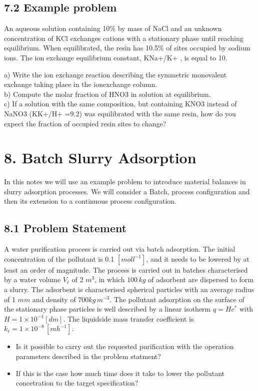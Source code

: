 \documentclass[letterpaper,10pt,english]{jupyterBook}
\begin{document}
\subsection{7.2 Example problem}
\label{\detokenize{Ion_Exchange:example-problem}}
\sphinxAtStartPar
An aqueous solution containing 10\% by mass of NaCl and an unknown concentration of KCl exchanges cations with a stationary phase until reaching equilibrium. When equilibrated, the resin has 10.5\% of sites occupied by sodium ions. The ion exchange equilibrium constant, KNa+/K+ , is equal to 10.

\sphinxAtStartPar
a)	Write the ion exchange reaction describing the symmetric monovalent exchange taking place in the ion\sphinxhyphen{}exchange column. 			\\
b)	Compute the molar fraction of HNO3 in solution at equilibrium.	\\
c)	If a solution with the same composition, but containing KNO3 instead of NaNO3
(KK+/H+ =9.2) was equilibrated with the same resin, how do you expect the fraction of occupied resin sites to change?

\sphinxstepscope


\section{8. Batch Slurry Adsorption}
\label{\detokenize{Slurry_Adsorption:batch-slurry-adsorption}}\label{\detokenize{Slurry_Adsorption::doc}}
\sphinxAtStartPar
In this notes we will use an example problem to introduce material balances in slurry adsorption processes. We will consider a Batch, process configuration and then its extension to a continuous process configuration.


\subsection{8.1 Problem Statement}
\label{\detokenize{Slurry_Adsorption:problem-statement}}
\sphinxAtStartPar
A water purification process is carried out via batch adsorption. The initial concentration of the pollutant is 0.1 \([mol l^{-1}]\), and it needs to be lowered by at least an order of magnitude. The process is carried out in batches characterised by a water volume \(V_{\ell}\) of 2 \(m^3\), in which \(100\,kg\) of adsorbent are dispersed to form a slurry. The adsorbent is characterised spherical particles with an average radius of 1 \(mm\) and density of \(700 kg\,m^{-3}\). The pollutant adsorption on the surface of the stationary phase particles is well described by a linear isotherm \(q=Hc^*\) with \(H=1\times{10^{-1}} [dm]\).  The liquid\sphinxhyphen{}side mass transfer coefficient is \(k_{\ell}=1\times{10^{-8}}\,[m h^{-1}]\).
\begin{itemize}
\item {} 
\sphinxAtStartPar
Is it possible to carry out the requested purification with the operation parameters described in the problem statment?

\item {} 
\sphinxAtStartPar
If this is the case how much time does it take to lower the pollutant concetration to the target specification?

\end{itemize}
\end{document}
